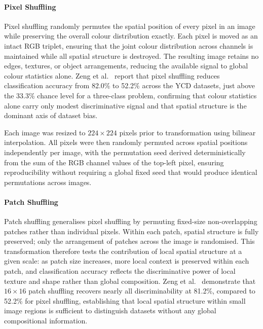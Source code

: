 \paragraph{Pixel Shuffling}
Pixel shuffling randomly permutes the spatial position of every pixel in 
an image while preserving the overall colour distribution exactly. Each 
pixel is moved as an intact RGB triplet, ensuring that the joint colour 
distribution across channels is maintained while all spatial structure is 
destroyed. The resulting image retains no edges, textures, or object 
arrangements, reducing the available signal to global colour statistics 
alone. Zeng et al.\ \cite{Zeng_2024_UnderstandingBiasinLargeScaleVisualDatasets} 
report that pixel shuffling reduces classification accuracy from 82.0\% to 
52.2\% across the YCD datasets, just above the 33.3\% chance level for a 
three-class problem, confirming that colour statistics alone carry only 
modest discriminative signal and that spatial structure is the dominant axis 
of dataset bias.

Each image was resized to $224 \times 224$ pixels prior to transformation 
using bilinear interpolation. All pixels were then randomly permuted across 
spatial positions independently per image, with the permutation seed derived 
deterministically from the sum of the RGB channel values of the top-left 
pixel, ensuring reproducibility without requiring a global fixed seed that 
would produce identical permutations across images.

\paragraph{Patch Shuffling}
Patch shuffling generalises pixel shuffling by permuting fixed-size 
non-overlapping patches rather than individual pixels. Within each patch, 
spatial structure is fully preserved; only the arrangement of patches across 
the image is randomised. This transformation therefore tests the contribution 
of local spatial structure at a given scale: as patch size increases, more 
local context is preserved within each patch, and classification accuracy 
reflects the discriminative power of local texture and shape rather than 
global composition. Zeng et al.\ \cite{Zeng_2024_UnderstandingBiasinLargeScaleVisualDatasets} 
demonstrate that $16 \times 16$ patch shuffling recovers nearly all 
discriminability at 81.2\%, compared to 52.2\% for pixel shuffling, 
establishing that local spatial structure within small image regions is 
sufficient to distinguish datasets without any global compositional 
information.

